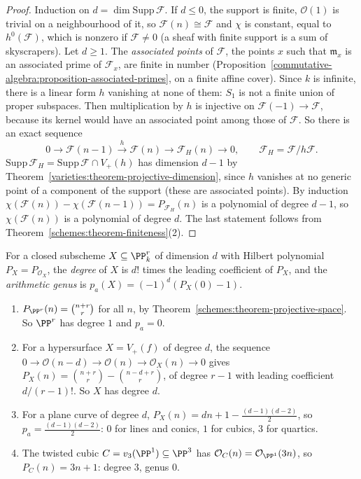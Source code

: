 \begin{proof}
Induction on $d = \dim\mathrm{Supp}\,\mathcal{F}$. If $d \leq 0$, the support is finite, $\mathcal{O}(1)$ is trivial on a neighbourhood of it, so $\mathcal{F}(n) \cong \mathcal{F}$ and
$\chi$ is constant, equal to $h^0(\mathcal{F})$, which is nonzero if $\mathcal{F} \neq 0$ (a sheaf with finite support is a sum of skyscrapers). Let $d \geq 1$. The
\emph{associated points} of $\mathcal{F}$, the points $x$ such that $\mathfrak{m}_x$ is an associated prime of $\mathcal{F}_x$, are finite in number
(Proposition~\ref{commutative-algebra:proposition-associated-primes}, on a finite affine cover). Since $k$ is infinite, there is a linear form $h$ vanishing at none of
them: $S_1$ is not a finite union of proper subspaces. Then multiplication by $h$ is injective on $\mathcal{F}(-1) \to \mathcal{F}$, because its kernel would have
an associated point among those of $\mathcal{F}$. So there is an exact sequence
\[
0 \to \mathcal{F}(n-1) \xrightarrow{h} \mathcal{F}(n) \to \mathcal{F}_H(n) \to 0, \qquad \mathcal{F}_H = \mathcal{F}/h\mathcal{F}.
\]
$\mathrm{Supp}\,\mathcal{F}_H = \mathrm{Supp}\,\mathcal{F} \cap V_+(h)$ has dimension $d - 1$ by Theorem~\ref{varieties:theorem-projective-dimension}, since $h$ vanishes at no generic
point of a component of the support (these are associated points). By induction $\chi(\mathcal{F}(n)) - \chi(\mathcal{F}(n-1)) = P_{\mathcal{F}_H}(n)$ is a polynomial of degree
$d - 1$, so $\chi(\mathcal{F}(n))$ is a polynomial of degree $d$. The last statement follows from Theorem~\ref{schemes:theorem-finiteness}(2).
\end{proof}

\begin{definition}\label{schemes:definition-degree-genus}
For a closed subscheme $X \subseteq \PP^r_k$ of dimension $d$ with Hilbert polynomial $P_X = P_{\mathcal{O}_X}$, the \emph{degree} of $X$ is $d!$ times the leading
coefficient of $P_X$, and the \emph{arithmetic genus} is $p_a(X) = (-1)^d(P_X(0) - 1)$.
\end{definition}

\begin{example}\label{schemes:example-hilbert-polynomials}
\begin{enumerate}
\item $P_{\PP^r}(n) = \binom{n+r}{r}$ for all $n$, by Theorem~\ref{schemes:theorem-projective-space}. So $\PP^r$ has degree $1$ and $p_a = 0$.
\item For a hypersurface $X = V_+(f)$ of degree $d$, the sequence $0 \to \mathcal{O}(n-d) \to \mathcal{O}(n) \to \mathcal{O}_X(n) \to 0$ gives
$P_X(n) = \binom{n+r}{r} - \binom{n-d+r}{r}$, of degree $r - 1$ with leading coefficient $d/(r-1)!$. So $X$ has degree $d$.
\item For a plane curve of degree $d$, $P_X(n) = dn + 1 - \frac{(d-1)(d-2)}{2}$, so $p_a = \frac{(d-1)(d-2)}{2}$: $0$ for lines and conics, $1$ for cubics, $3$ for quartics.
\item The twisted cubic $C = v_3(\PP^1) \subseteq \PP^3$ has $\mathcal{O}_C(n) = \mathcal{O}_{\PP^1}(3n)$, so $P_C(n) = 3n + 1$: degree $3$, genus $0$.
\end{enumerate}
\end{example}

